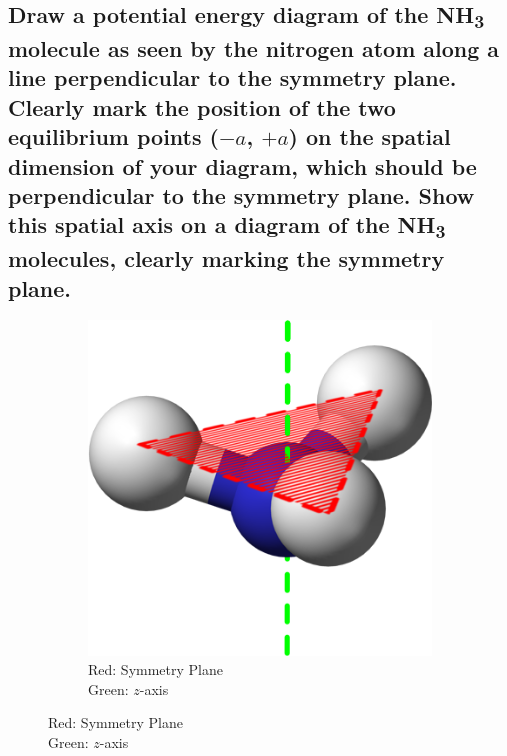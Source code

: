 \documentclass[a4paper]{scrartcl}
\begin{document}
\subsection{Draw a potential energy diagram of the NH\textsubscript{3} molecule as seen by the nitrogen atom along a line perpendicular to the symmetry plane. Clearly mark the position of the two equilibrium points (\(-a\), \(+a\)) on the spatial dimension of your diagram, which should be perpendicular to the symmetry plane. Show this spatial axis on a diagram of the NH\textsubscript{3} molecules, clearly marking the symmetry plane.}
\begin{figure}[h]
    \centering
    \begin{subfigure}{0.5 \textwidth}
    \end{subfigure}
    \begin{subfigure}{0.2 \textwidth}
        \centering
        \includegraphics[width = \textwidth]{ammonia-inversion-axis.png}
        \caption*{Red: Symmetry Plane\\ Green: \(z\)-axis}
    \end{subfigure}
\end{figure}
\end{document}
